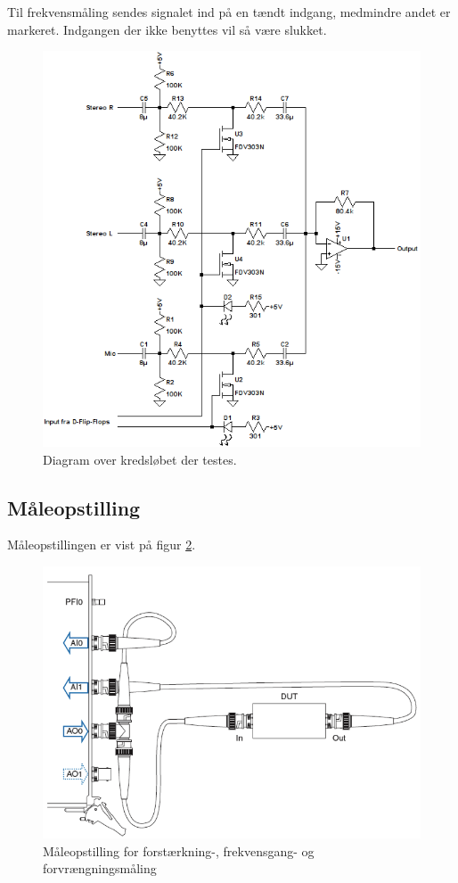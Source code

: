 Til frekvensmåling sendes signalet ind på en tændt indgang, medmindre andet er markeret. Indgangen der ikke benyttes vil så være slukket.
\begin{figure}[h]
\centering
\includegraphics[scale=0.8]{maalerapporter/indgangsvaelger/indgangvaelger_ltspice_diagram.png}
\caption{Diagram over kredsløbet der testes.}
\label{maalerap_diagram_simulering}
\end{figure}

\subsection*{Måleopstilling}
Måleopstillingen er vist på figur \ref{fig:indgangthd:maaleop-thd}.

\begin{figure}[h]
\centering
\includegraphics[scale=0.4]{maalerapporter/indgangsvaelger/maaleopstilling-thd-forforstaerker.png}
\caption{Måleopstilling for forstærkning-, frekvensgang- og forvrængningsmåling \cite{maaling-mm5}}
\label{fig:indgangthd:maaleop-thd}
\end{figure}


